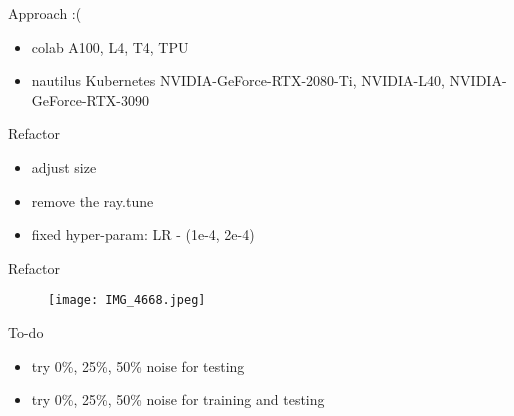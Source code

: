 \begin{frame}{Approach :(}
    \begin{itemize}
        \item colab 
              A100, L4, T4, TPU
        \item nautilus 
              Kubernetes 
              NVIDIA-GeForce-RTX-2080-Ti, NVIDIA-L40, NVIDIA-GeForce-RTX-3090
    \end{itemize}
\end{frame}

\begin{frame}{Refactor}
    \begin{itemize}
        \item
              adjust size
        \item
              remove the ray.tune
        \item
              fixed hyper-param: LR - (1e-4, 2e-4) 
    \end{itemize}
\end{frame}

\begin{frame}{Refactor}
    \begin{figure} 
        \centering
        \texttt{[image: IMG\_4668.jpeg]} 
    \end{figure}
\end{frame}

\begin{frame}{To-do}
    \begin{itemize}
        \item try 0\%, 25\%, 50\% noise for testing
        \item try 0\%, 25\%, 50\% noise for training and testing
    \end{itemize}
\end{frame}


